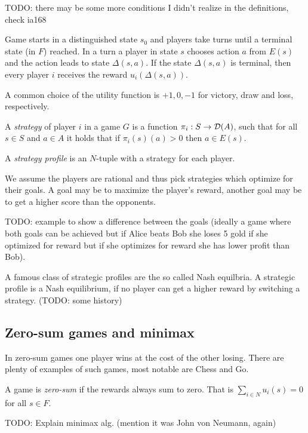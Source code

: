TODO: there may be some more conditions I didn't realize in the definitions, check
ia168

Game starts in a distinguished state $s_0$ and players take turns until
a terminal state (in $F$) reached. In a turn a player in state $s$ chooses
action $a$ from $E(s)$ and the action leads to state $\Delta(s,a)$.
If the state $\Delta(s,a)$ is terminal, then every player $i$ receives
the reward $u_i(\Delta(s,a))$.

A common choice of the utility function is $+1, 0, -1$ for victory, draw
and loss, respectively.

\begin{definition}
    A {\em strategy} of player $i$ in a game $G$ is a function
    $\pi_i : S \to \mathcal{D}(A)$, such that for all $s \in S$ and $a
    \in A$ it holds that if $\pi_i(s)(a) > 0$ then $a \in E(s)$.

    A {\em strategy profile} is an $N$-tuple with a strategy for each player.
\end{definition}

We assume the players are rational and thus pick strategies which
optimize for their goals. A goal may be to maximize the player's reward,
another goal may be to get a higher score than the opponents.

TODO: example to show a difference between the goals (ideally a game
where both goals can be achieved but if Alice beats Bob she loses 5 gold
if she optimized for reward but if she optimizes for reward she has
lower profit than Bob).

A famous class of strategic profiles are the so called Nash equilbria.
A strategic profile is a Nash equilibrium, if no player can get a higher
reward by switching a strategy. (TODO: some history)

\subsection{Zero-sum games and minimax}

In zero-sum games one player wins at the cost of the other losing.
There are plenty of examples of such games, most notable are Chess and Go.

\begin{definition}
    A game is {\em zero-sum} if the rewards always sum to zero.
    That is $\sum_{i \in N} u_i(s) = 0$ for all $s \in F$.
\end{definition}

TODO: Explain minimax alg. (mention it was John von Neumann, again)

